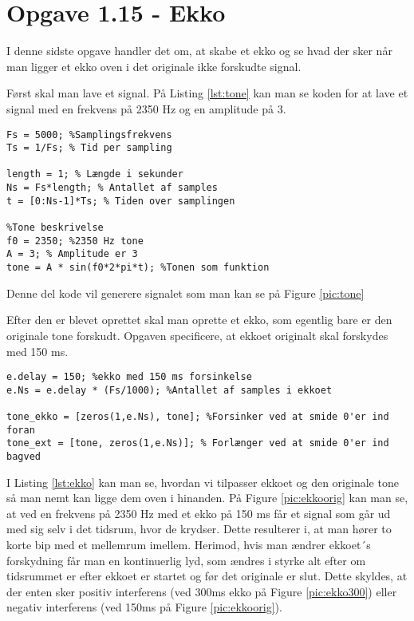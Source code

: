 \documentclass[../main.tex]{subfiles}
\begin{document}
\section{Opgave 1.15 - Ekko}
I denne sidste opgave handler det om, at skabe et ekko og se hvad der sker når man ligger et ekko oven i det originale ikke forskudte signal.

Først skal man lave et signal.
På Listing \ref{lst:tone} kan man se koden for at lave et signal med en frekvens på 2350 Hz og en amplitude på 3.
\begin{lstlisting}[caption={Oprettelse af ikke forskudt tone}, label={lst:tone}]
Fs = 5000; %Samplingsfrekvens
Ts = 1/Fs; % Tid per sampling
    
length = 1; % Længde i sekunder
Ns = Fs*length; % Antallet af samples
t = [0:Ns-1]*Ts; % Tiden over samplingen

%Tone beskrivelse
f0 = 2350; %2350 Hz tone
A = 3; % Amplitude er 3
tone = A * sin(f0*2*pi*t); %Tonen som funktion    
\end{lstlisting}
Denne del kode vil generere signalet som man kan se på Figure \ref{pic:tone}

Efter den er blevet oprettet skal man oprette et ekko, som egentlig bare er den originale tone forskudt. Opgaven specificere, at ekkoet originalt skal forskydes med 150 ms.
\begin{lstlisting}[caption={Oprettelse af ekko}, label={lst:ekko}]
e.delay = 150; %ekko med 150 ms forsinkelse
e.Ns = e.delay * (Fs/1000); %Antallet af samples i ekkoet

tone_ekko = [zeros(1,e.Ns), tone]; %Forsinker ved at smide 0'er ind foran
tone_ext = [tone, zeros(1,e.Ns)]; % Forlænger ved at smide 0'er ind bagved
\end{lstlisting}

I Listing \ref{lst:ekko} kan man se, hvordan vi tilpasser ekkoet og den originale tone så man nemt kan ligge dem oven i hinanden.
På Figure \ref{pic:ekkoorig} kan man se, at ved en frekvens på 2350 Hz med et ekko på 150 ms får et signal som går ud med sig selv i det tidsrum, hvor de krydser.
Dette resulterer i, at man hører to korte bip med et mellemrum imellem. 
Herimod, hvis man ændrer ekkoet´s forskydning får man en kontinuerlig lyd, som ændres i styrke alt efter om tidsrummet er efter ekkoet er startet og før det originale er slut.
Dette skyldes, at der enten sker positiv interferens (ved 300ms ekko på Figure \ref{pic:ekko300}) eller negativ interferens (ved 150ms på Figure \ref{pic:ekkoorig}).
\end{document}
